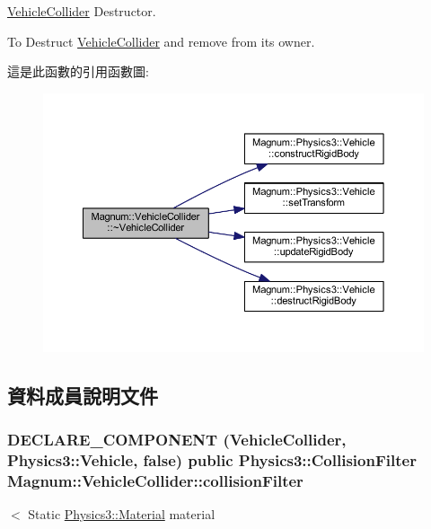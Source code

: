 \hyperlink{class_magnum_1_1_vehicle_collider}{Vehicle\+Collider} Destructor. 

To Destruct \hyperlink{class_magnum_1_1_vehicle_collider}{Vehicle\+Collider} and remove from its owner. 

這是此函數的引用函數圖\+:\nopagebreak
\begin{figure}[H]
\begin{center}
\leavevmode
\includegraphics[width=350pt]{class_magnum_1_1_vehicle_collider_a77ca7dc0653dd6bb43d91ad01ce6b8ea_cgraph}
\end{center}
\end{figure}




\subsection{資料成員說明文件}
\subsubsection[{\texorpdfstring{collision\+Filter}{collisionFilter}}]{\setlength{\rightskip}{0pt plus 5cm}D\+E\+C\+L\+A\+R\+E\+\_\+\+C\+O\+M\+P\+O\+N\+E\+NT ({\bf Vehicle\+Collider}, {\bf Physics3\+::\+Vehicle}, false) public {\bf Physics3\+::\+Collision\+Filter} Magnum\+::\+Vehicle\+Collider\+::collision\+Filter}\hypertarget{class_magnum_1_1_vehicle_collider_a445376e710c29b1d15ad15f907e23fd3}{}\label{class_magnum_1_1_vehicle_collider_a445376e710c29b1d15ad15f907e23fd3}


$<$ Static \hyperlink{class_magnum_1_1_physics3_1_1_material}{Physics3\+::\+Material} material 

